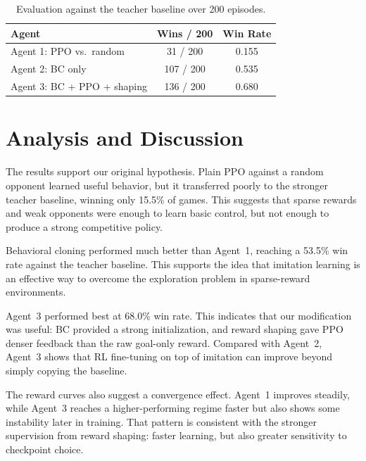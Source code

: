 \documentclass{article}
\begin{document}
\begin{table}[h]
\centering
\caption{Evaluation against the teacher baseline over 200 episodes.}
\label{tab:eval}
\begin{tabular}{lcc}
\toprule
\textbf{Agent} & \textbf{Wins / 200} & \textbf{Win Rate} \\
\midrule
Agent 1: PPO vs.\ random & 31 / 200 & 0.155 \\
Agent 2: BC only & 107 / 200 & 0.535 \\
Agent 3: BC + PPO + shaping & 136 / 200 & 0.680 \\
\bottomrule
\end{tabular}
\end{table}

\section{Analysis and Discussion}

The results support our original hypothesis.
Plain PPO against a random opponent learned useful behavior, but it transferred
poorly to the stronger teacher baseline, winning only 15.5\% of games.
This suggests that sparse rewards and weak opponents were enough to learn basic
control, but not enough to produce a strong competitive policy.

Behavioral cloning performed much better than Agent~1, reaching a 53.5\% win
rate against the teacher baseline.
This supports the idea that imitation learning is an effective way to overcome
the exploration problem in sparse-reward environments.

Agent~3 performed best at 68.0\% win rate.
This indicates that our modification was useful: BC provided a strong
initialization, and reward shaping gave PPO denser feedback than the raw
goal-only reward.
Compared with Agent~2, Agent~3 shows that RL fine-tuning on top of imitation can
improve beyond simply copying the baseline.

The reward curves also suggest a convergence effect.
Agent~1 improves steadily, while Agent~3 reaches a higher-performing regime
faster but also shows some instability later in training.
That pattern is consistent with the stronger supervision from reward shaping:
faster learning, but also greater sensitivity to checkpoint choice.
\end{document}
